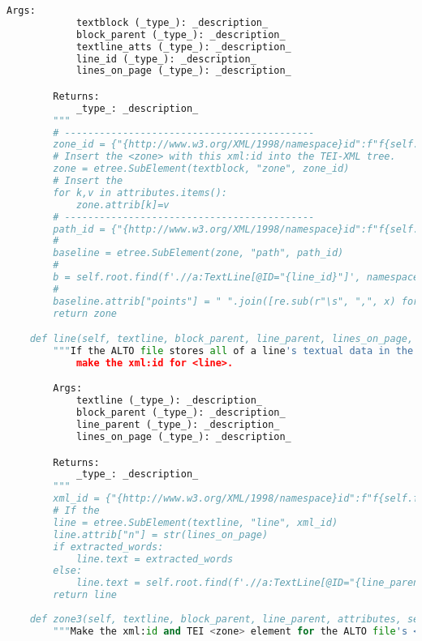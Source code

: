 \documentclass[class=article, crop=false]{standalone}
\begin{document}
\begin{lstlisting}[language=python, style=python]
        Args:
            textblock (_type_): _description_
            block_parent (_type_): _description_
            textline_atts (_type_): _description_
            line_id (_type_): _description_
            lines_on_page (_type_): _description_

        Returns:
            _type_: _description_
        """         
        # -------------------------------------------
        zone_id = {"{http://www.w3.org/XML/1998/namespace}id":f"f{self.folio}-{block_parent}-{line_id}-lineCount{lines_on_page}"}
        # Insert the <zone> with this xml:id into the TEI-XML tree.
        zone = etree.SubElement(textblock, "zone", zone_id)
        # Insert the 
        for k,v in attributes.items():
            zone.attrib[k]=v
        # -------------------------------------------
        path_id = {"{http://www.w3.org/XML/1998/namespace}id":f"f{self.folio}-{block_parent}-{line_id}-lineCount{lines_on_page}-baseline"}
        #
        baseline = etree.SubElement(zone, "path", path_id)
        #
        b = self.root.find(f'.//a:TextLine[@ID="{line_id}"]', namespaces=NS).get("BASELINE")
        #
        baseline.attrib["points"] = " ".join([re.sub(r"\s", ",", x) for x in re.findall(r"(\d+ \d+)", b)])
        return zone

    def line(self, textline, block_parent, line_parent, lines_on_page, extracted_words):
        """If the ALTO file stores all of a line's textual data in the <TextLine> attribute @CONTENT, 
            make the xml:id for <line>.

        Args:
            textline (_type_): _description_
            block_parent (_type_): _description_
            line_parent (_type_): _description_
            lines_on_page (_type_): _description_

        Returns:
            _type_: _description_
        """        
        xml_id = {"{http://www.w3.org/XML/1998/namespace}id":f"f{self.folio}-{block_parent}-{line_parent}-lineCount{lines_on_page}-text"}
        # If the 
        line = etree.SubElement(textline, "line", xml_id)
        line.attrib["n"] = str(lines_on_page)
        if extracted_words:
            line.text = extracted_words
        else:
            line.text = self.root.find(f'.//a:TextLine[@ID="{line_parent}"]/a:String', namespaces=NS).get("CONTENT")
        return line
        
    def zone3(self, textline, block_parent, line_parent, attributes, seg_id, strings_on_page):
        """Make the xml:id and TEI <zone> element for the ALTO file's <String> (segment/word).


\end{lstlisting}
\end{document}
